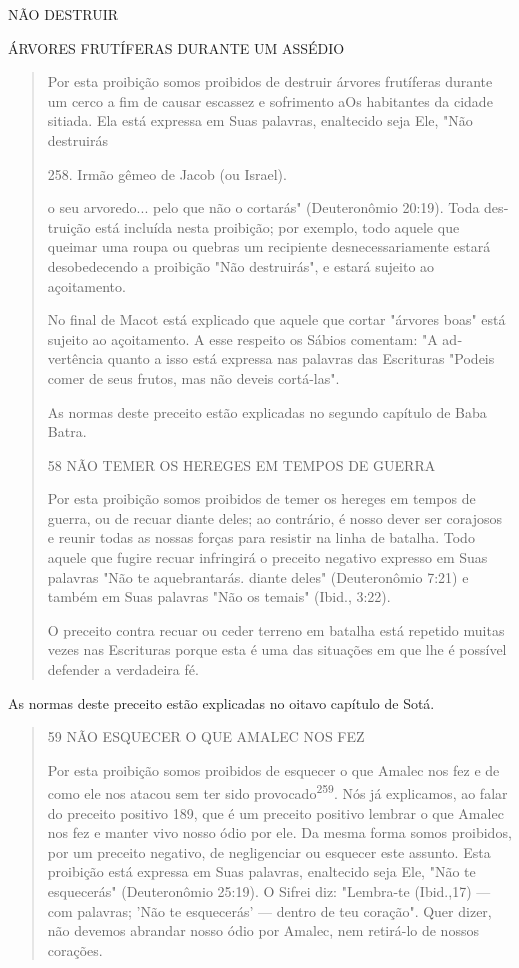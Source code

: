 NÃO DESTRUIR

ÁRVORES FRUTÍFERAS DURANTE UM ASSÉDIO

\begin{quote}
Por esta proibição somos proibidos de destruir árvores frutíferas
du­rante um cerco a fim de causar escassez e sofrimento aOs habitantes
da cidade sitiada. Ela está expressa em Suas palavras, enaltecido seja
Ele, "Não destruirás

258. Irmão gêmeo de Jacob (ou Israel).

o seu arvoredo... pelo que não o cortarás" (Deuteronômio 20:19). Toda
des­truição está incluída nesta proibição; por exemplo, todo aquele que
queimar uma roupa ou quebras um recipiente desnecessariamente estará
desobedecen­do a proibição "Não destruirás", e estará sujeito ao
açoitamento.

No final de Macot está explicado que aquele que cortar "árvores boas"
está sujeito ao açoitamento. A esse respeito os Sábios comentam: "A
ad­vertência quanto a isso está expressa nas palavras das Escrituras
"Podeis comer de seus frutos, mas não deveis cortá-las".

As normas deste preceito estão explicadas no segundo capítulo de Baba
Batra.

58 NÃO TEMER OS HEREGES EM TEMPOS DE GUERRA

Por esta proibição somos proibidos de temer os hereges em tempos de
guerra, ou de recuar diante deles; ao contrário, é nosso dever ser
corajosos e reunir todas as nossas forças para resistir na linha de
batalha. Todo aquele que fugire recuar infringirá o preceito negativo
expresso em Suas palavras "Não te aquebrantarás. diante deles"
(Deuteronômio 7:21) e também em Suas pala­vras "Não os temais" (Ibid.,
3:22).

O preceito contra recuar ou ceder terreno em batalha está repetido
muitas vezes nas Escrituras porque esta é uma das situações em que lhe é
possí­vel defender a verdadeira fé.
\end{quote}

As normas deste preceito estão explicadas no oitavo capítulo de Sotá.

\begin{quote}
59 NÃO ESQUECER O QUE AMALEC NOS FEZ

Por esta proibição somos proibidos de esquecer o que Amalec nos fez e de
como ele nos atacou sem ter sido provocado\textsuperscript{259}. Nós já
explicamos, ao falar do preceito positivo 189, que é um preceito
positivo lembrar o que Amalec nos fez e manter vivo nosso ódio por ele.
Da mesma forma somos proi­bidos, por um preceito negativo, de
negligenciar ou esquecer este assunto. Es­ta proibição está expressa em
Suas palavras, enaltecido seja Ele, "Não te esque­cerás" (Deuteronômio
25:19). O Sifrei diz: "Lembra-te (Ibid.,17) --- com pala­vras; 'Não te
esquecerás' --- dentro de teu coração". Quer dizer, não devemos abrandar
nosso ódio por Amalec, nem retirá-lo de nossos corações.
\end{quote}

